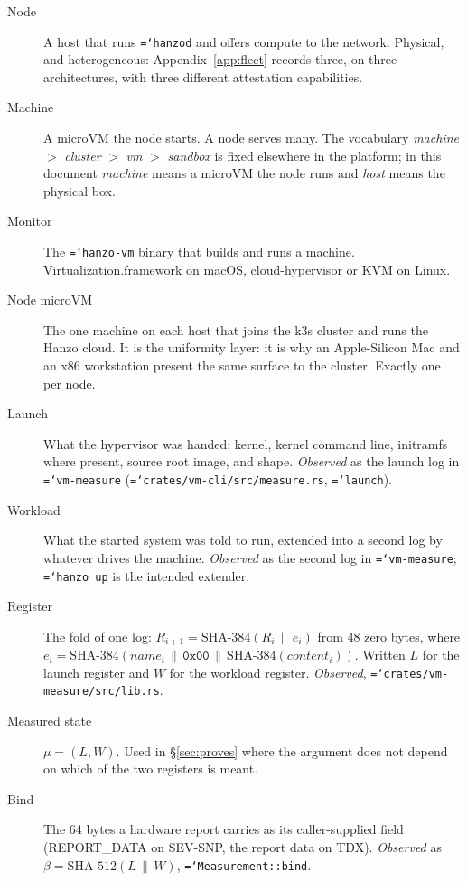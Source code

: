 \documentclass[11pt,a4paper]{article}
\newcommand{\code}[1]{\texttt{\hyphenchar\font=`\-\relax #1}}
\newcommand{\sha}[1]{\mathrm{SHA\text{-}#1}}
\begin{document}
\begin{description}
\item[Node] A host that runs \code{hanzod} and offers compute to the network.
  Physical, and heterogeneous: Appendix~\ref{app:fleet} records three, on three
  architectures, with three different attestation capabilities.

\item[Machine] A microVM the node starts. A node serves many. The vocabulary
  \emph{machine} $>$ \emph{cluster} $>$ \emph{vm} $>$ \emph{sandbox} is fixed
  elsewhere in the platform; in this document \emph{machine} means a microVM the
  node runs and \emph{host} means the physical box.

\item[Monitor] The \code{hanzo-vm} binary that builds and runs a machine.
  Virtualization.framework on macOS, cloud-hypervisor or KVM on Linux.

\item[Node microVM] The one machine on each host that joins the k3s cluster and
  runs the Hanzo cloud. It is the uniformity layer: it is why an Apple-Silicon
  Mac and an x86 workstation present the same surface to the cluster. Exactly one
  per node.

\item[Launch] What the hypervisor was handed: kernel, kernel command line,
  initramfs where present, source root image, and shape. \emph{Observed} as the
  launch log in \code{vm-measure} (\code{crates/vm-cli/src/measure.rs},
  \code{launch}).

\item[Workload] What the started system was told to run, extended into a second
  log by whatever drives the machine. \emph{Observed} as the second log in
  \code{vm-measure}; \code{hanzo up} is the intended extender.

\item[Register] The fold of one log:
  $R_{i+1} = \sha{384}(R_i \,\|\, e_i)$ from 48 zero bytes, where
  $e_i = \sha{384}(\mathit{name}_i \,\|\, \mathtt{0x00} \,\|\, \sha{384}(\mathit{content}_i))$.
  Written $L$ for the launch register and $W$ for the workload register.
  \emph{Observed}, \code{crates/vm-measure/src/lib.rs}.

\item[Measured state] $\mu = (L, W)$. Used in \S\ref{sec:proves} where the
  argument does not depend on which of the two registers is meant.

\item[Bind] The 64 bytes a hardware report carries as its caller-supplied field
  (REPORT\_DATA on SEV-SNP, the report data on TDX). \emph{Observed} as
  $\beta = \sha{512}(L \,\|\, W)$, \code{Measurement::bind}.


\end{description}
\end{document}
